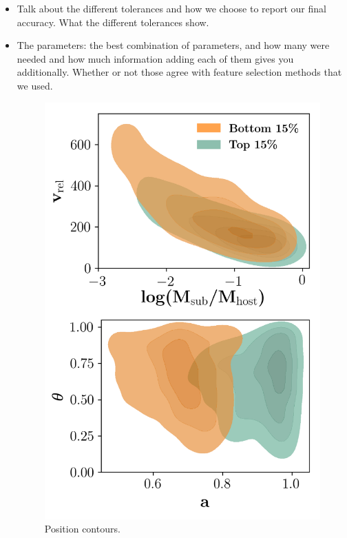 \documentclass[fleqn,usenatbib]{mnras}
\begin{document}
\begin{itemize}
    \item Talk about the different tolerances and how we choose to report our final accuracy. What the different tolerances show.
	\item The parameters: the best combination of parameters, and how many were needed and how much information adding each of them gives you additionally. Whether or not those agree with feature selection methods that we used. 
\begin{figure}
	\includegraphics[width=\textwidth]{Figures/position_contours}
    \caption{Position contours.}
    \label{fig:position_contours}
\end{figure}
\end{itemize}
\end{document}
